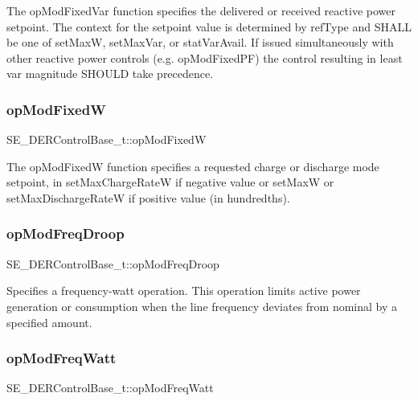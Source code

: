 The op\+Mod\+Fixed\+Var function specifies the delivered or received reactive power setpoint. The context for the setpoint value is determined by ref\+Type and S\+H\+A\+LL be one of set\+MaxW, set\+Max\+Var, or stat\+Var\+Avail. If issued simultaneously with other reactive power controls (e.\+g. op\+Mod\+Fixed\+PF) the control resulting in least var magnitude S\+H\+O\+U\+LD take precedence. \mbox{\label{group__DERControlBase_ga14d4dc75a71ba474a05b997aae88e069}} 
\subsubsection{\texorpdfstring{op\+Mod\+FixedW}{opModFixedW}}
{\footnotesize\ttfamily S\+E\+\_\+\+D\+E\+R\+Control\+Base\+\_\+t\+::op\+Mod\+FixedW}

The op\+Mod\+FixedW function specifies a requested charge or discharge mode setpoint, in set\+Max\+Charge\+RateW if negative value or set\+MaxW or set\+Max\+Discharge\+RateW if positive value (in hundredths). \mbox{\label{group__DERControlBase_gae6d51c07133aedc89b90801e45e86cc1}} 
\subsubsection{\texorpdfstring{op\+Mod\+Freq\+Droop}{opModFreqDroop}}
{\footnotesize\ttfamily S\+E\+\_\+\+D\+E\+R\+Control\+Base\+\_\+t\+::op\+Mod\+Freq\+Droop}

Specifies a frequency-\/watt operation. This operation limits active power generation or consumption when the line frequency deviates from nominal by a specified amount. \mbox{\label{group__DERControlBase_ga78557963030045b7549535be8003bb1b}} 
\subsubsection{\texorpdfstring{op\+Mod\+Freq\+Watt}{opModFreqWatt}}
{\footnotesize\ttfamily S\+E\+\_\+\+D\+E\+R\+Control\+Base\+\_\+t\+::op\+Mod\+Freq\+Watt}

